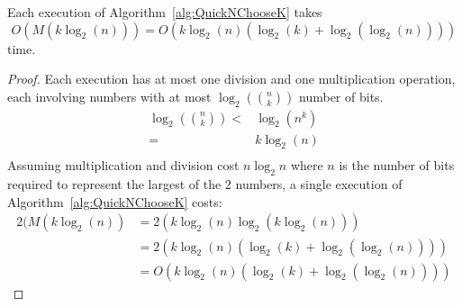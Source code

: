 \begin{theorem}
\label{theorem:QuickNChooseKcomplexity}
Each execution of Algorithm~\ref{alg:QuickNChooseK} takes $$O\left(M(k \log_2 (n))\right) = O \left(k\log_2 (n)(\log_2 (k)+\log_2(\log_2 (n)))\right)$$ time.
\end{theorem}
\begin{proof}
Each execution has at most one division and one multiplication operation, each involving numbers with at most $\log_2 ({n \choose k})$ number of bits.
\begin{align}
\log_2 ({n \choose k}) <& \log_2 (n^k) \\
=& k\log_2 (n) \\
\end{align}
Assuming multiplication and division cost $n \log_2 n$ where $n$ is the number of bits required to represent the largest of the $2$ numbers, a single execution of Algorithm~\ref{alg:QuickNChooseK} costs:
\begin{align}
2 (M(k\log_2 (n) ) &= 2 (k\log_2 (n)\log_2(k\log_2 (n))) \\
&= 2 (k\log_2 (n)(\log_2 (k)+\log_2(\log_2 (n)))) \\
&= O\left(k\log_2 (n)(\log_2 (k)+\log_2(\log_2 (n)))\right)
\end{align}
\end{proof}

